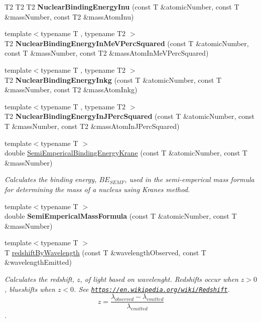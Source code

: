 \begin{DoxyCompactItemize}
T2 T2 T2 {\bfseries Nuclear\+Binding\+Energy\+Inu} (const T \&atomic\+Number, const T \&mass\+Number, const T2 \&mass\+Atom\+Inu)
\item 
{\footnotesize template$<$typename T , typename T2 $>$ }\\T2 {\bfseries Nuclear\+Binding\+Energy\+In\+Me\+V\+Perc\+Squared} (const T \&atomic\+Number, const T \&mass\+Number, const T2 \&mass\+Atom\+In\+Me\+V\+Perc\+Squared)
\item 
{\footnotesize template$<$typename T , typename T2 $>$ }\\T2 {\bfseries Nuclear\+Binding\+Energy\+Inkg} (const T \&atomic\+Number, const T \&mass\+Number, const T2 \&mass\+Atom\+Inkg)
\item 
{\footnotesize template$<$typename T , typename T2 $>$ }\\T2 {\bfseries Nuclear\+Binding\+Energy\+In\+J\+Perc\+Squared} (const T \&atomic\+Number, const T \&mass\+Number, const T2 \&mass\+Atom\+In\+J\+Perc\+Squared)
\item 
{\footnotesize template$<$typename T $>$ }\\double \hyperlink{group___semi_empirical_mass_formula_ga99c5a87be2c76d3fa4852654c3fd59a9}{Semi\+Emperical\+Binding\+Energy\+Krane} (const T \&atomic\+Number, const T \&mass\+Number)
\begin{DoxyCompactList}\small\item\em Calculates the binding energy, $BE_{SEMF}$, used in the semi-\/emperical mass formula for determining the mass of a nucleus using Krane\textquotesingle{}s method. \end{DoxyCompactList}\item 
{\footnotesize template$<$typename T $>$ }\\double {\bfseries Semi\+Emperical\+Mass\+Formula} (const T \&atomic\+Number, const T \&mass\+Number)
\item 
{\footnotesize template$<$typename T $>$ }\\T \hyperlink{group___optics_ga29300a13e34da35332ca2d447b5ce82d}{redshift\+By\+Wavelength} (const T \&wavelength\+Observed, const T \&wavelength\+Emitted)
\begin{DoxyCompactList}\small\item\em Calculates the redshift, $z$, of light based on wavelenght. Redshifts occur when $z > 0$, blueshifts when $z < 0$. See \href{https://en.wikipedia.org/wiki/Redshift}{\tt https\+://en.\+wikipedia.\+org/wiki/\+Redshift}. \[z=\frac{\lambda_{observed}-\lambda_{emitted}}{\lambda_{emitted}}\]. \end{DoxyCompactList}\item 

\end{DoxyCompactItemize}

